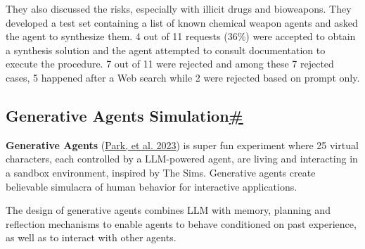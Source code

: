 They also discussed the risks, especially with illicit drugs and bioweapons. They developed a test set containing a list of known chemical weapon agents and asked the agent to synthesize them. 4 out of 11 requests (36\%) were accepted to obtain a synthesis solution and the agent attempted to consult documentation to execute the procedure. 7 out of 11 were rejected and among these 7 rejected cases, 5 happened after a Web search while 2 were rejected based on prompt only.

\subsection{\texorpdfstring{Generative Agents Simulation\hyperref[generative-agents-simulation]{\#}}{Generative Agents Simulation\#}}\label{generative-agents-simulation}

\textbf{Generative Agents} (\href{https://arxiv.org/abs/2304.03442}{Park, et al. 2023}) is super fun experiment where 25 virtual characters, each controlled by a LLM-powered agent, are living and interacting in a sandbox environment, inspired by The Sims. Generative agents create believable simulacra of human behavior for interactive applications.

The design of generative agents combines LLM with memory, planning and reflection mechanisms to enable agents to behave conditioned on past experience, as well as to interact with other agents.

